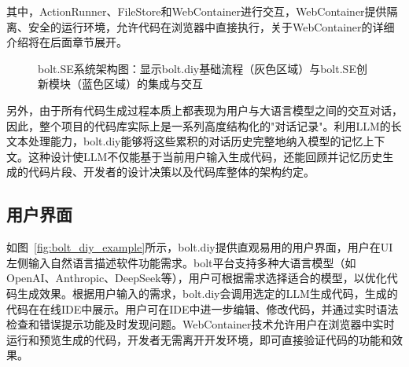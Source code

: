 其中，ActionRunner、FileStore和WebContainer进行交互，WebContainer提供隔离、安全的运行环境，允许代码在浏览器中直接执行，关于WebContainer的详细介绍将在后面章节展开。

\begin{figure}[H]
  \caption{bolt.SE系统架构图：显示bolt.diy基础流程（灰色区域）与bolt.SE创新模块（蓝色区域）的集成与交互}
  \label{fig:bolt_sequence}
\end{figure}

另外，由于所有代码生成过程本质上都表现为用户与大语言模型之间的交互对话，因此，整个项目的代码库实际上是一系列高度结构化的"对话记录"。利用LLM的长文本处理能力，bolt.diy能够将这些累积的对话历史完整地纳入模型的记忆上下文。这种设计使LLM不仅能基于当前用户输入生成代码，还能回顾并记忆历史生成的代码片段、开发者的设计决策以及代码库整体的架构约定。

\subsection{用户界面}

如图~\ref{fig:bolt_diy_example}所示，bolt.diy提供直观易用的用户界面，用户在UI左侧输入自然语言描述软件功能需求。bolt平台支持多种大语言模型（如OpenAI、Anthropic、DeepSeek等），用户可根据需求选择适合的模型，以优化代码生成效果。根据用户输入的需求，bolt.diy会调用选定的LLM生成代码，生成的代码在在线IDE中展示。用户可在IDE中进一步编辑、修改代码，并通过实时语法检查和错误提示功能及时发现问题。WebContainer技术允许用户在浏览器中实时运行和预览生成的代码，开发者无需离开开发环境，即可直接验证代码的功能和效果。

